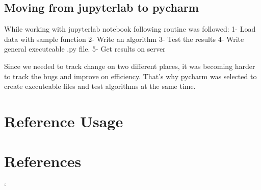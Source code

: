\documentclass[12pt]{article}
\begin{document}
\subsection{Moving from jupyterlab to pycharm}
While working with jupyterlab notebook following routine was followed:
1- Load data with sample function
2- Write an algorithm
3- Test the results
4- Write general executeable .py file.
5- Get results on server

Since we needed to track change on two different places,
it was becoming harder to track the bugs and improve on efficiency.
That's why pycharm was selected to create executeable files and test
algorithms at the same time.
\section{Reference Usage}
\newpage
\section{References}
\begingroup
\nocite{*}
\renewcommand{\section}[2]{}
`

\endgroup
\end{document}
